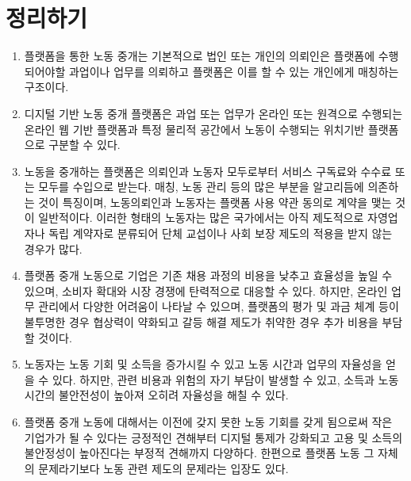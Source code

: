 \section*{정리하기}
\begin{enumerate}
\item 플랫폼을 통한 노동 중개는 기본적으로 법인 또는 개인의 의뢰인은 플랫폼에 수행되어야할 과업이나 업무를 의뢰하고 플랫폼은 이를 할 수 있는 개인에게 매칭하는 구조이다.
\item 디지털 기반 노동 중개 플랫폼은 과업 또는 업무가 온라인 또는 원격으로 수행되는 온라인 웹 기반 플랫폼과 특정 물리적 공간에서 노동이 수행되는 위치기반 플랫폼으로 구분할 수 있다.
\item 노동을 중개하는 플랫폼은 의뢰인과 노동자 모두로부터 서비스 구독료와 수수료 또는 모두를 수입으로 받는다. 매칭, 노동 관리 등의 많은 부분을 알고리듬에 의존하는 것이 특징이며, 노동의뢰인과 노동자는 플랫폼 사용 약관 동의로 계약을 맺는 것이 일반적이다. 이러한 형태의 노동자는 많은 국가에서는 아직 제도적으로 자영업자나 독립 계약자로 분류되어 단체 교섭이나 사회 보장 제도의 적용을 받지 않는 경우가 많다.
\item 플랫폼 중개 노동으로 기업은 기존 채용 과정의 비용을 낮추고 효율성을 높일 수 있으며, 소비자 확대와 시장 경쟁에 탄력적으로 대응할 수 있다. 하지만, 온라인 업무 관리에서 다양한 어려움이 나타날 수 있으며, 플랫폼의 평가 및 과금 체계 등이 불투명한 경우 협상력이 약화되고 갈등 해결 제도가 취약한 경우 추가 비용을 부담할 것이다.
\item 노동자는 노동 기회 및 소득을 증가시킬 수 있고 노동 시간과 업무의 자율성을 얻을 수 있다. 하지만, 관련 비용과 위험의 자기 부담이 발생할 수 있고, 소득과 노동 시간의 불안전성이 높아져 오히려 자율성을 해칠 수 있다.
\item 플랫폼 중개 노동에 대해서는 이전에 갖지 못한 노동 기회를 갖게 됨으로써 작은 기업가가 될 수 있다는 긍정적인 견해부터 디지털 통제가 강화되고 고용 및 소득의 불안정성이 높아진다는 부정적 견해까지 다양하다. 한편으로 플랫폼 노동 그 자체의 문제라기보다 노동 관련 제도의 문제라는 입장도 있다. 
\end{enumerate}


